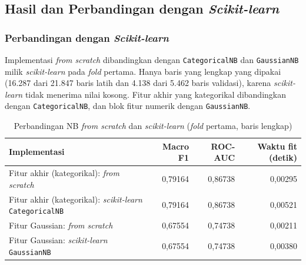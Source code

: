 \subsection{Hasil dan Perbandingan dengan \textit{Scikit-learn}}
\label{subsec:nb-hasil}

\subsubsection{Perbandingan dengan \textit{Scikit-learn}}
Implementasi \textit{from scratch} dibandingkan dengan \texttt{CategoricalNB} dan \texttt{GaussianNB} milik \textit{scikit-learn} pada \textit{fold} pertama. Hanya baris yang lengkap yang dipakai (16.287 dari 21.847 baris latih dan 4.138 dari 5.462 baris validasi), karena \textit{scikit-learn} tidak menerima nilai kosong. Fitur akhir yang kategorikal dibandingkan dengan \texttt{CategoricalNB}, dan blok fitur numerik dengan \texttt{GaussianNB}.

\begin{table}[H]
	\centering
	\caption{Perbandingan NB \textit{from scratch} dan \textit{scikit-learn} (\textit{fold} pertama, baris lengkap)}
	\label{tab:nb-hasil}
	\begin{tabularx}{\textwidth}{Y r r r}
		\toprule
		\textbf{Implementasi} & \textbf{Macro F1} & \textbf{ROC-AUC} & \textbf{Waktu fit (detik)} \\
		\midrule
		Fitur akhir (kategorikal): \textit{from scratch} & 0,79164 & 0,86738 & 0,00295 \\
		Fitur akhir (kategorikal): \textit{scikit-learn} \texttt{CategoricalNB} & 0,79164 & 0,86738 & 0,00521 \\
		\midrule
		Fitur Gaussian: \textit{from scratch} & 0,67554 & 0,74738 & 0,00211 \\
		Fitur Gaussian: \textit{scikit-learn} \texttt{GaussianNB} & 0,67554 & 0,74738 & 0,00380 \\
		\bottomrule
	\end{tabularx}
\end{table}



